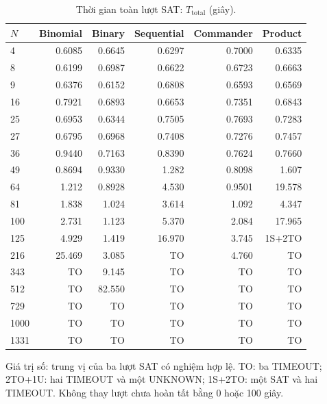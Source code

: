 \begin{table}[pos=H]
\centering
\small
\caption{Thời gian toàn lượt SAT: $T_{\mathrm{total}}$ (giây).}
\label{tab:sat_total}
\setlength{\tabcolsep}{4pt}
\begin{tabular}{@{}lrrrrr@{}}
\toprule
$N$ & Binomial & Binary & Sequential & Commander & Product \\
\midrule
4 & 0.6085 & 0.6645 & 0.6297 & 0.7000 & 0.6335 \\
8 & 0.6199 & 0.6987 & 0.6622 & 0.6723 & 0.6663 \\
9 & 0.6376 & 0.6152 & 0.6808 & 0.6593 & 0.6569 \\
16 & 0.7921 & 0.6893 & 0.6653 & 0.7351 & 0.6843 \\
25 & 0.6953 & 0.6344 & 0.7505 & 0.7693 & 0.7283 \\
27 & 0.6795 & 0.6968 & 0.7408 & 0.7276 & 0.7457 \\
36 & 0.9440 & 0.7163 & 0.8390 & 0.7624 & 0.7660 \\
49 & 0.8694 & 0.9330 & 1.282 & 0.8098 & 1.607 \\
64 & 1.212 & 0.8928 & 4.530 & 0.9501 & 19.578 \\
81 & 1.838 & 1.024 & 3.614 & 1.092 & 4.347 \\
100 & 2.731 & 1.123 & 5.370 & 2.084 & 17.965 \\
125 & 4.929 & 1.419 & 16.970 & 3.745 & 1S+2TO \\
216 & 25.469 & 3.085 & TO & 4.760 & TO \\
343 & TO & 9.145 & TO & TO & TO \\
512 & TO & 82.550 & TO & TO & TO \\
729 & TO & TO & TO & TO & TO \\
1000 & TO & TO & TO & TO & TO \\
1331 & TO & TO & TO & TO & TO \\
\bottomrule
\end{tabular}
\par\smallskip\begin{minipage}{\linewidth}\footnotesize Giá trị số: trung vị của ba lượt SAT có nghiệm hợp lệ. TO: ba TIMEOUT; 2TO+1U: hai TIMEOUT và một UNKNOWN; 1S+2TO: một SAT và hai TIMEOUT. Không thay lượt chưa hoàn tất bằng 0 hoặc 100 giây.\end{minipage}
\end{table}
